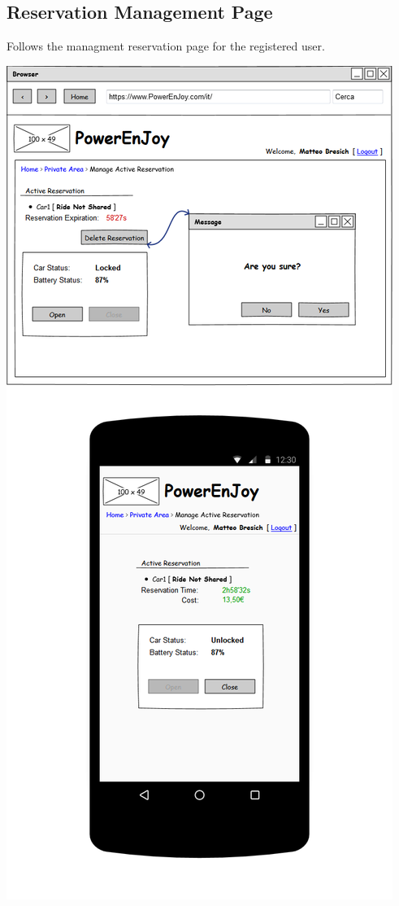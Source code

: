 \subsection{Reservation Management Page} Follows the managment reservation page for the registered user.
\begin{center}
	\includegraphics[width=0.6\linewidth]{"img/ui/delete-reservation"}
\end{center}
\pagebreak

